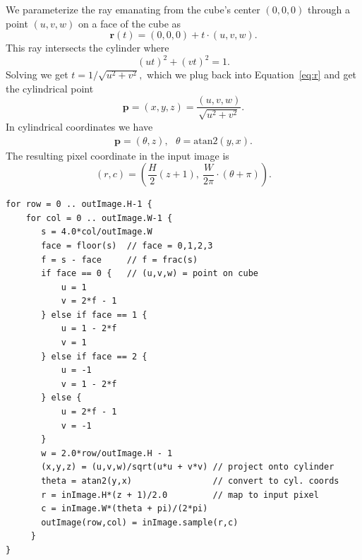 \documentclass[11pt, oneside]{article}   	%
\begin{document}
We parameterize the ray emanating from 
the cube's center $(0,0,0)$ through a point $(u,v,w)$ on a face of the cube as
\begin{equation}
  \mathbf{r}(t) = (0,0,0) + t\cdot(u,v,w). \label{eq:r}
\end{equation}
This ray intersects the cylinder where
\begin{equation}
  (ut)^2 + (vt)^2 = 1.
\end{equation}
Solving we get $t = 1/\sqrt{u^2 + v^2},$ which we plug back into Equation~\ref{eq:r} and
get the cylindrical point
\begin{equation}
  \mathbf{p} = (x,y,z) = \frac{(u,v,w)}{\sqrt{u^2 + v^2}}.
\end{equation}
In cylindrical coordinates we have
\begin{eqnarray}
\mathbf{p} = \left(\theta, z\right), \ \ \ 
  \theta = \mbox{atan2}\left(y,x\right).
\end{eqnarray}
The resulting pixel coordinate in the input image is
\begin{equation}
(r,c) = \left(\frac{H}{2}\left(z + 1\right),\ \frac{W}{2\pi}\cdot(\theta + \pi)\right).
\end{equation}




\begin{verbatim}
for row = 0 .. outImage.H-1 {
    for col = 0 .. outImage.W-1 {
       s = 4.0*col/outImage.W
       face = floor(s)  // face = 0,1,2,3
       f = s - face     // f = frac(s)
       if face == 0 {   // (u,v,w) = point on cube
           u = 1
           v = 2*f - 1
       } else if face == 1 {
           u = 1 - 2*f
           v = 1
       } else if face == 2 {
           u = -1
           v = 1 - 2*f
       } else {
           u = 2*f - 1
           v = -1
       }
       w = 2.0*row/outImage.H - 1
       (x,y,z) = (u,v,w)/sqrt(u*u + v*v) // project onto cylinder
       theta = atan2(y,x)                // convert to cyl. coords
       r = inImage.H*(z + 1)/2.0         // map to input pixel
       c = inImage.W*(theta + pi)/(2*pi)
       outImage(row,col) = inImage.sample(r,c)
     }
}
\end{verbatim}


\end{document}

